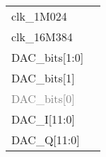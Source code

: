 \documentclass[journal,twoside]{IEEEtran}
\begin{document}
\begin{figure}
  \sffamily\notsotiny
  \begin{tabularx}{\linewidth}{@{}lX@{}}
    clk\_1M024 &  \\
    clk\_16M384 &  \\
    DAC\_bits[1:0] &  \\
    DAC\_bits[1] &  \\
    \textcolor{gray}{DAC\_bits[0]} &  \\
    DAC\_I[11:0] &  \\
    DAC\_Q[11:0] &  \\
  \end{tabularx}%
\end{figure}
\end{document}
